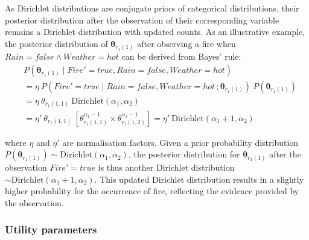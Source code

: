 As Dirichlet distributions are conjugate priors of categorical distributions, their posterior distribution after the observation of their corresponding variable remains a Dirichlet distribution with updated counts. As an illustrative example, the posterior distribution of $\boldsymbol\theta_{r_{1}(1)}$ after observing a fire when $\mathit{Rain}\!=\!\mathit{false} \land \mathit{Weather}\!=\!\mathit{hot}$ can be derived from Bayes' rule: 
\begin{align}
&P(\boldsymbol\theta_{r_{1}(1)} \; | \; \mathit{Fire}'\!=\!\mathit{true}, \mathit{Rain}\!=\!\mathit{false}, \mathit{Weather}\!=\!\mathit{hot}) \nonumber \\
& = \eta \ P(\mathit{Fire}'\!=\!\mathit{true} \; | \; \mathit{Rain}\!=\!\mathit{false}, \mathit{Weather}\!=\!\mathit{hot}\,; \boldsymbol\theta_{r_{1}(1)}) \ P(\boldsymbol\theta_{r_{1}(1)}) \nonumber \\
& = \eta \ \theta_{r_{1}(1,1)} \ \mathrm{Dirichlet}(\alpha_1,\alpha_2) \nonumber \\
& = \eta' \ \theta_{r_{1}(1,1)} \ [ \theta_{r_{1}(1,1)}^{\alpha_1 - 1} \times \theta_{r_{1}(1,2)}^{\alpha_2 - 1} ]   = \eta' \ \textrm{Dirichlet}(\alpha_1+1,\alpha_2) \nonumber 
\end{align}

where $\eta$ and $\eta'$ are normalisation factors.  Given a prior probability distribution $P(\boldsymbol\theta_{r_{1}(1)}) \sim \mathrm{Dirichlet}(\alpha_1, \alpha_2)$, the posterior distribution for $\boldsymbol\theta_{r_{1}(1)}$ after the observation  $\mathit{Fire}'\!=\!\mathit{true}$ is thus another Dirichlet distribution $\sim \mathrm{Dirichlet}(\alpha_1+1,\alpha_2)$.  This updated Dirichlet distribution results in a slightly higher probability for the occurrence of fire, reflecting the evidence provided by the observation.  %



\subsubsection*{Utility parameters}

